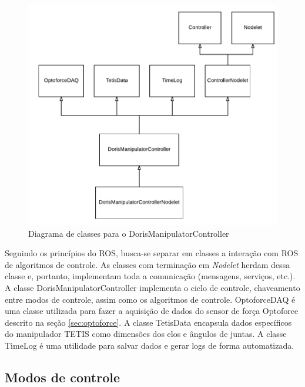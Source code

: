 \begin{figure}[!h]
  \centering
  \includegraphics[width=0.9\linewidth]{./img/class_diagram}
  \caption{Diagrama de classes para o DorisManipulatorController}
  \label{fig:classes}
\end{figure}

Seguindo os princípios do ROS, busca-se separar em classes a interação com ROS de algoritmos de controle. As classes com terminação em \textit{Nodelet} herdam dessa classe e, portanto, implementam toda a comunicação (mensagens, serviços, etc.). A classe DorisManipulatorController implementa o ciclo de controle, chaveamento entre modos de controle, assim como os algoritmos de controle. OptoforceDAQ é uma classe utilizada para fazer a aquisição de dados do sensor de força Optoforce descrito na seção \ref{sec:optoforce}. A classe TetisData encapsula dados específicos do manipulador TETIS como dimensões dos elos e ângulos de juntas. A classe TimeLog é uma utilidade para salvar dados e gerar logs de forma automatizada. 

\subsection{Modos de controle}

